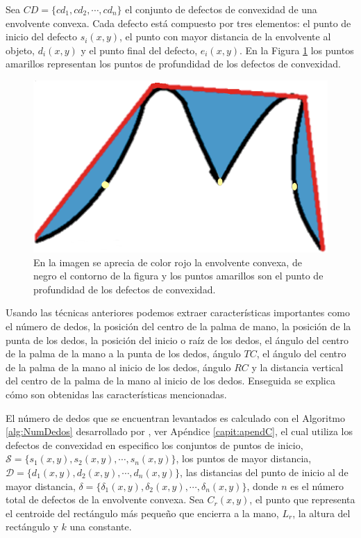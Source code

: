 Sea $CD=\lbrace cd_1, cd_2, \cdots, cd_n \rbrace$ el conjunto de defectos de convexidad de una envolvente convexa. Cada defecto está compuesto por tres elementos: el punto de inicio del defecto $s_i(x,y)$, el punto con mayor distancia de la envolvente al objeto, $d_i(x,y)$ y el punto final del defecto, $e_i(x,y)$.
En la Figura \ref{fig:FigConvexHullDefects} los puntos amarillos representan los puntos de profundidad de los defectos de convexidad. 

\begin{figure}[h!]
\begin{center}
\includegraphics[scale=.4]{./Figures/ConvexHullAndDefects.png}
\end{center}
\caption{En la imagen se aprecia de color rojo la envolvente convexa, de negro el contorno de la figura y los puntos amarillos son el punto de profundidad de los defectos de convexidad.}
\label{fig:FigConvexHullDefects}
\end{figure}  

Usando las técnicas anteriores podemos extraer características importantes como el número de dedos, la posición del centro de la palma de mano, la posición de la punta de los dedos, la posición del inicio o raíz de los dedos, el ángulo del centro de la palma de la mano a la punta de los dedos, ángulo $TC$, el ángulo del centro de la palma de la mano al inicio de los dedos, ángulo $RC$ y la distancia vertical del centro de la palma de la mano al inicio de los dedos. Enseguida se explica cómo son obtenidas las características mencionadas. 

El número de dedos que se encuentran levantados es calculado con el Algoritmo \ref{alg:NumDedos} desarrollado por \citep{Kathuria2011}, ver Apéndice \ref{capit:apendC}, el cual utiliza los defectos de convexidad en especifico los conjuntos de puntos de inicio, $\mathcal{S}=\lbrace s_1(x,y), s_2(x,y), \cdots, \allowbreak s_n(x,y) \rbrace$, los puntos de mayor distancia, $\mathcal{D}=\lbrace d_1(x,y), d_2(x,y), \cdots, d_n(x,y) \rbrace$, las distancias del punto de inicio al de mayor distancia, $\mathcal{\delta}=\lbrace \delta_1(x,y), \delta_2(x,y), \cdots, \delta_n(x,y) \rbrace$, donde $n$ es el número total de defectos de la envolvente convexa.
Sea $C_r(x,y)$, el punto que representa el centroide del rectángulo más pequeño que encierra a la mano, $L_r$, la altura del rectángulo y $k$ una constante. 

